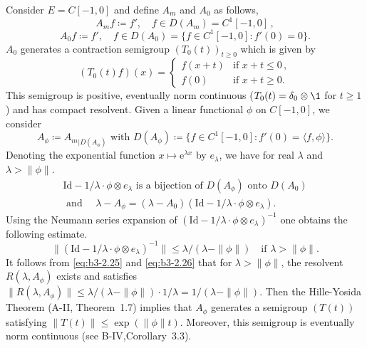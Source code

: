 \begin{example}
\begin{enumerate}[\upshape (i), wide, labelindent=.5em]
	Consider $E = C[-1,0]$ and define $A_{m}$ and $A_{0}$ as follows,
	\begin{equation}\label{eq:b3-2.23}
		A_{m}f \coloneqq f', \quad f \in D(A_{m}) = C^{1}[-1,0]\,,
	\end{equation}
	\begin{equation}\label{eq:b3-2.24}
		A_{0}f \coloneqq f', \quad f \in D(A_{0}) = \{f \in C^{1}[-1,0] \colon f'(0) = 0\}.
	\end{equation}
	$A_{0}$ generates a contraction semigroup $(T_{0}(t))_{t \geq 0}$ which is given by
	\begin{equation}\label{eq:b3-2.25}
		(T_{0}(t)f)(x) = \begin{cases}
			f(x+t) & \text{if } x+t \leq 0\,, \\
			f(0) & \text{if } x+t \geq 0.
		\end{cases}
	\end{equation}
	This semigroup is positive, eventually norm continuous ($T_{0}(t) = \delta_{0}\otimes \1$ for $t \geq 1$) and has compact resolvent.
	Given a linear functional $\phi$ on $C[-1,0]$, we consider
	\begin{equation}\label{eq:b3-2.26}
		A_{\phi} \coloneqq {A_{m}}_{|D(A_{\phi})} \text{ with } D(A_{\phi}) \coloneqq \{f \in C^{1}[-1,0] \colon f'(0) = \langle f,\phi \rangle\}.
	\end{equation}
	Denoting the exponential function $x \mapsto \mathrm{e}^{\lambda x}$ by $e_{\lambda}$, we have for real $\lambda$ and $\lambda > \|\phi\|$.
	 \begin{equation}\label{eq:b3-2.27}
	 \begin{aligned}
		\text{Id} - 1/\lambda \cdot \phi \otimes e_{\lambda} \text{ is a bijection of } D(A_{\phi}) \text{ onto } D(A_{0})   \\
		\text{ and }\quad \lambda - A_{\phi} = (\lambda - A_{0})(\text{Id} - 1/\lambda \cdot \phi \otimes e_{\lambda}).
	\end{aligned}
	\end{equation}
	Using the Neumann series expansion of $(\text{Id} - 1/\lambda \cdot \phi \otimes e_{\lambda})^{-1}$ one obtains the following estimate.
	\begin{equation}\label{eq:b3-2.28}
		\|(\text{Id} - 1/\lambda \cdot \phi \otimes e_{\lambda})^{-1}\| \leq \lambda/(\lambda - \|\phi\|) \quad \text{if } \lambda > \|\phi\|.
	\end{equation}
It follows from \eqref{eq:b3-2.25} and \eqref{eq:b3-2.26} that for $\lambda > \|\phi\|$, the resolvent $R(\lambda,A_{\phi})$ exists and satisfies $\|R(\lambda,A_{\phi})\| \leq \lambda/(\lambda-\|\phi\|)\cdot 1/\lambda = 1/(\lambda-\|\phi\|)$.
Then the Hille-Yosida Theorem (A-II, Theorem~1.7) implies that $A_{\phi}$ generates a semigroup $(T(t))$ satisfying $\|T(t)\| \leq \exp(\|\phi\|t)$.
Moreover, this semigroup is eventually norm continuous (see B-IV,Corollary~3.3).


\end{enumerate}
\end{example}
